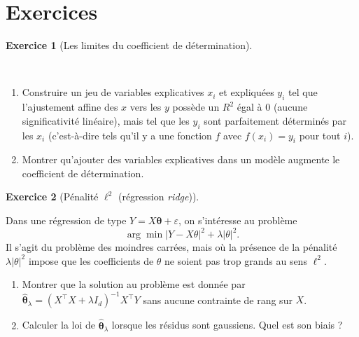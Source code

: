 \documentclass[
  10,
  letterpaper,
  DIV=11,
  numbers=noendperiod]{scrreport}
\providecommand{\tightlist}{%
  \setlength{\itemsep}{0pt}\setlength{\parskip}{0pt}}\usepackage{longtable,booktabs,array}
\newcommand{\bt}{\boldsymbol{\theta}}
\theoremstyle{plain}
\theoremstyle{definition}
\newtheorem{exercise}{Exercice}[chapter]
\theoremstyle{plain}
\theoremstyle{definition}
\theoremstyle{definition}
\theoremstyle{plain}
\theoremstyle{remark}
\begin{document}
\hypertarget{exercices-7}{%
\section*{Exercices}\label{exercices-7}}


\begin{exercise}[Les limites du coefficient de
détermination]\protect\hypertarget{exr-corrcaus}{}\label{exr-corrcaus}

~

\begin{enumerate}
\def\labelenumi{\arabic{enumi}.}
\tightlist
\item
  Construire un jeu de variables explicatives \(x_i\) et expliquées
  \(y_i\) tel que l'ajustement affine des \(x\) vers les \(y\) possède
  un \(R^2\) égal à 0 (aucune significativité linéaire), mais tel que
  les \(y_i\) sont parfaitement déterminés par les \(x_i\) (c'est-à-dire
  tels qu'il y a une fonction \(f\) avec \(f(x_i)=y_i\) pour tout
  \(i\)).
\item
  Montrer qu'ajouter des variables explicatives dans un modèle augmente
  le coefficient de détermination.
\end{enumerate}

\end{exercise}

\begin{exercise}[Pénalité \(\ell^2\) (régression
\emph{ridge})]\protect\hypertarget{exr-regl2}{}\label{exr-regl2}

Dans une régression de type \(Y = X\bt + \varepsilon\), on s'intéresse
au problème \[ \arg \min |Y - X\theta|^2 + \lambda |\theta|^2.\] Il
s'agit du problème des moindres carrées, mais où la présence de la
pénalité \(\lambda|\theta|^2\) impose que les coefficients de \(\theta\)
ne soient pas trop grands au sens \(\ell^2\).

\begin{enumerate}
\def\labelenumi{\arabic{enumi}.}
\tightlist
\item
  Montrer que la solution au problème est donnée par
  \(\hat{\bt}_{\lambda} = (X^\top X + \lambda I_d)^{-1}X^\top Y\) sans
  aucune contrainte de rang sur \(X\).
\item
  Calculer la loi de \(\hat{\bt}_{\lambda}\) lorsque les résidus sont
  gaussiens. Quel est son biais ?
\end{enumerate}

\end{exercise}
\end{document}
